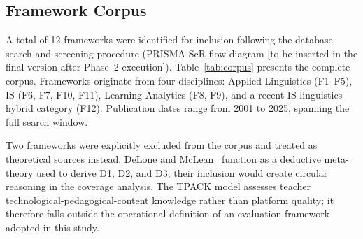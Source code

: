 \documentclass[conference]{IEEEtran}
\begin{document}
\subsection{Framework Corpus}

A total of 12 frameworks were identified for inclusion following the
database search and screening procedure (PRISMA-ScR flow diagram
[to be inserted in the final version after Phase~2 execution]).
Table~\ref{tab:corpus} presents the complete corpus. Frameworks
originate from four disciplines: Applied Linguistics (F1--F5), IS
(F6, F7, F10, F11), Learning Analytics (F8, F9), and a recent
IS-linguistics hybrid category (F12). Publication dates range from
2001 to 2025, spanning the full search window.

Two frameworks were explicitly excluded from the corpus and treated as
theoretical sources instead. DeLone and McLean~\cite{b10} function as
a deductive meta-theory used to derive D1, D2, and D3; their inclusion
would create circular reasoning in the coverage analysis. The TPACK
model assesses teacher technological-pedagogical-content knowledge
rather than platform quality; it therefore falls outside the
operational definition of an evaluation framework adopted in this
study.
\end{document}
